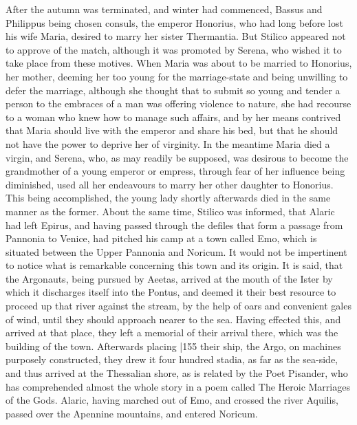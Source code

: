 After the autumn was terminated, and winter had commenced, Bassus and Philippus being chosen consuls, the emperor Honorius, who had long before lost his wife Maria, desired to marry her sister Thermantia. But Stilico appeared not to approve of the match, although it was promoted by Serena, who wished it to take place from these motives. When Maria was about to be married to Honorius, her mother, deeming her too young for the marriage-state and being unwilling to defer the marriage, although she thought that to submit so young and tender a person to the embraces of a man was offering violence to nature, she had recourse to a woman who knew how to manage such affairs, and by her means contrived that Maria should live with the emperor and share his bed, but that he should not have the power to deprive her of virginity. In the meantime Maria died a virgin, and Serena, who, as may readily be supposed, was desirous to become the grandmother of a young emperor or empress, through fear of her influence being diminished, used all her endeavours to marry her other daughter to Honorius. This being accomplished, the young lady shortly afterwards died in the same manner as the former. About the same time, Stilico was informed, that Alaric had left Epirus, and having passed through the defiles that form a passage from Pannonia to Venice, had pitched his camp at a town called Emo, which is situated between the Upper Pannonia and Noricum. It would not be impertinent to notice what is remarkable concerning this town and its origin. It is said, that the Argonauts, being pursued by Aeetas, arrived at the mouth of the Ister by which it discharges itself into the Pontus, and deemed it their best resource to proceed up that river against the stream, by the help of oars and convenient gales of wind, until they should approach nearer to the sea. Having effected this, and arrived at that place, they left a memorial of their arrival there, which was the building of the town. Afterwards placing
|155 their ship, the Argo, on machines purposely constructed, they drew it four hundred stadia, as far as the sea-side, and thus arrived at the Thessalian shore, as is related by the Poet Pisander, who has comprehended almost the whole story in a poem called The Heroic Marriages of the Gods. Alaric, having marched out of Emo, and crossed the river Aquilis, passed over the Apennine mountains, and entered Noricum.

